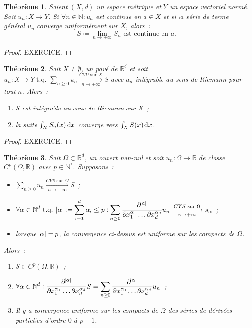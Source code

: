 \documentclass{report}
\newtheorem{thm}{Théorème}[chapter]
\theoremstyle{definition}
\theoremstyle{remark}
\newcommand{\R}{\mathbb R}
\newcommand{\N}{\mathbb N}
\newcommand{\tq}{\text{ t.q. }}
\newcommand{\CONV}[5]{\xrightarrow[#2 \to #3]{#4 \text{ #5 } #1}}
\newcommand{\CVS}[3]{\CONV{#1}{#2}{#3}{CVS}{sur}}
\newcommand{\CVU}[3]{\CONV{#1}{#2}{#3}{CVU}{sur}}
\newcommand{\pinfty}{{+\infty}}
\newcommand{\evn}{espace vectoriel normé}
\begin{document}
			\begin{thm}\label{thm:fncvusériecvg} Soient $(X, d)$ un espace métrique et $Y$ un \evn. Soit $u_n : X \to Y$. Si $\forall n \in \N : u_n$ est continue en
			$a \in X$ et si la série de terme général $u_n$ converge uniformément sur $X$, alors~:
			\[S \coloneqq \lim_{n \to \pinfty}S_n \text{ est continue en } a.\]
			\end{thm}

			\begin{proof} EXERCICE.
			\end{proof}

			\begin{thm} Soit $X \neq \emptyset$, un pavé de $\R^d$ et soit $u_n : X \to Y \tq \sum_{n \geq 0}u_n \CVU Xn\pinfty S$ avec $u_n$ intégrable au
			sens de Riemann pour tout $n$. Alors~:
			\begin{enumerate}
				\item $S$ est intégrable au sens de Riemann sur $X$~;
				\item la suite $\int_XS_n(x)\dif x$ converge vers $\int_XS(x)\dif x$.
			\end{enumerate}
			\end{thm}

			\begin{proof} EXERCICE.
			\end{proof}

			\begin{thm} Soit $\Omega \subset \R^d$, un ouvert non-nul et soit $u_n : \Omega \to \R$ de classe $C^p(\Omega, \R)$ avec $p \in \N^*$.
			Supposons~:
			\begin{itemize}
				\item $\sum_{n \geq 0}u_n \CVS \Omega n\pinfty S$~;
				\item $\displaystyle \forall \alpha \in \N^d \tq \abs \alpha \coloneqq \sum_{i=1}^d\alpha_i \leq p :
					\sum_{n \geq 0}\frac {\partial^{\abs \alpha}}{\partial x_1^{\alpha_1}\ldots\partial x_d^{\alpha_d}}u_n \CVS \Omega n\pinfty s_{\alpha}$~;
				\item lorsque $\abs \alpha = p$, la convergence ci-dessus est uniforme sur les compacts de $\Omega$.
			\end{itemize}

			Alors~:
			\begin{enumerate}
				\item $S \in C^p(\Omega, \R)$~;
				\item $\displaystyle \forall \alpha \in \N^d :
					\frac {\partial^{\abs \alpha}}{\partial x_1^{\alpha_1}\ldots\partial x_d^{\alpha_d}}S =
						\sum_{n \geq 0}\frac {\partial^{\abs \alpha}}{\partial x_1^{\alpha_1}\ldots\partial x_d^{\alpha_d}}u_n$~;
				\item Il y a convergence uniforme sur les compacts de $\Omega$ des séries de dérivées partielles d'ordre $0$ à $p-1$.
			\end{enumerate}
			\end{thm}
\end{document}
